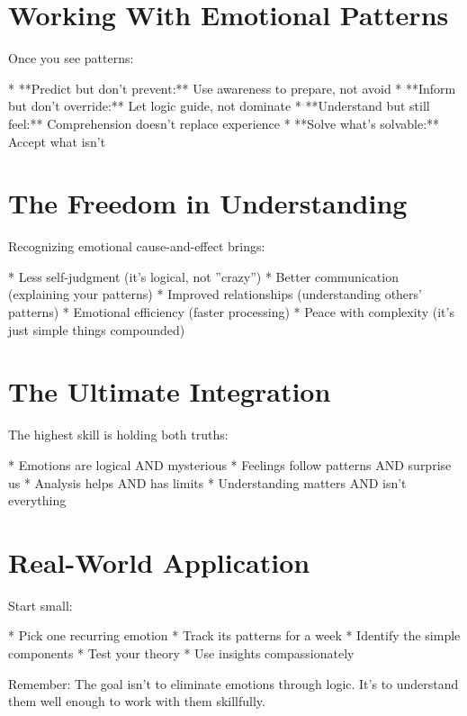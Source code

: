 \documentclass[12pt,oneside]{book}
\begin{document}
\section{Working With Emotional Patterns}

Once you see patterns:

                    * **Predict but don't prevent:** Use awareness to prepare, not avoid
                    * **Inform but don't override:** Let logic guide, not dominate
                    * **Understand but still feel:** Comprehension doesn't replace experience
                    * **Solve what's solvable:** Accept what isn't

\section{The Freedom in Understanding}

Recognizing emotional cause-and-effect brings:

                    * Less self-judgment (it's logical, not ''crazy'')
                    * Better communication (explaining your patterns)
                    * Improved relationships (understanding others' patterns)
                    * Emotional efficiency (faster processing)
                    * Peace with complexity (it's just simple things compounded)

\section{The Ultimate Integration}

The highest skill is holding both truths:

                    * Emotions are logical AND mysterious
                    * Feelings follow patterns AND surprise us
                    * Analysis helps AND has limits
                    * Understanding matters AND isn't everything

\section{Real-World Application}

Start small:

                    * Pick one recurring emotion
                    * Track its patterns for a week
                    * Identify the simple components
                    * Test your theory
                    * Use insights compassionately

Remember: The goal isn't to eliminate emotions through logic. It's to understand them well enough to work with them skillfully.
\end{document}
